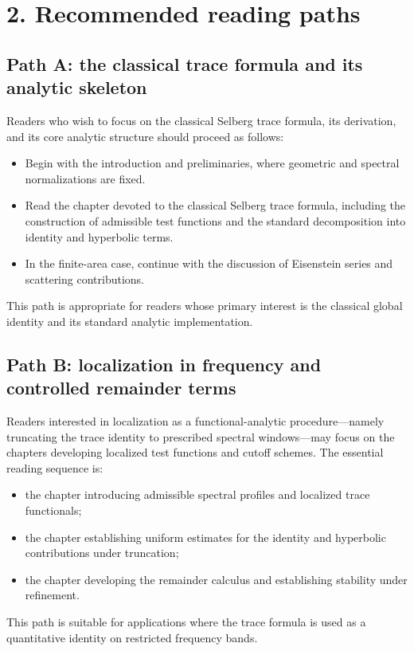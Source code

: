 \section*{2. Recommended reading paths}

\subsection*{Path A: the classical trace formula and its analytic skeleton}

\noindent
Readers who wish to focus on the classical Selberg trace formula, its derivation, and its core analytic structure should proceed as follows:
\begin{itemize}
  \item Begin with the introduction and preliminaries, where geometric and spectral normalizations are fixed.
  \item Read the chapter devoted to the classical Selberg trace formula, including the construction of admissible test functions and the standard decomposition into identity and hyperbolic terms.
  \item In the finite-area case, continue with the discussion of Eisenstein series and scattering contributions.
\end{itemize}
This path is appropriate for readers whose primary interest is the classical global identity and its standard analytic implementation.

\subsection*{Path B: localization in frequency and controlled remainder terms}

\noindent
Readers interested in localization as a functional-analytic procedure---namely truncating the trace identity to prescribed spectral windows---may focus on the chapters developing localized test functions and cutoff schemes.
The essential reading sequence is:
\begin{itemize}
  \item the chapter introducing admissible spectral profiles and localized trace functionals;
  \item the chapter establishing uniform estimates for the identity and hyperbolic contributions under truncation;
  \item the chapter developing the remainder calculus and establishing stability under refinement.
\end{itemize}
This path is suitable for applications where the trace formula is used as a quantitative identity on restricted frequency bands.

